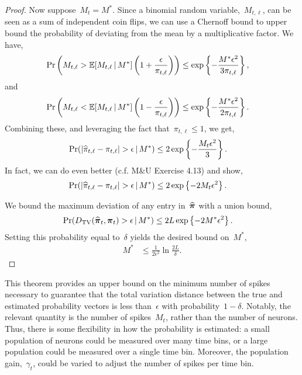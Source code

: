 \begin{proof}
Now suppose~$M_t=M^*$. Since a binomial random variable,~$M_{t,\ell}$, can be seen
as a sum of independent coin flips, we can use a Chernoff bound to
upper bound the probability of deviating from the mean by a
multiplicative factor. We
have,
\begin{align}
  \Pr \left(M_{t, \ell} > \mathbb{E}[M_{t,\ell} \,|\, M^*] \left(1+\frac{\epsilon}{\pi_{t, \ell}} \right) \right) 
  &\leq \exp \left \{- \frac{M^* \epsilon^2}{3 \pi_{t, \ell}} \right \},
\end{align}
and
\begin{align}
  \Pr \left(M_{t, \ell} < \mathbb{E}[M_{t,\ell} \,|\, M^*] \left(1-\frac{\epsilon}{\pi_{t, \ell}} \right) \right) 
  &\leq \exp \left \{- \frac{M^* \epsilon^2}{2 \pi_{t, \ell}} \right \}.
\end{align}
Combining these, and leveraging the fact that~$\pi_{t, \ell} \leq 1$, we get,
\begin{align}
  \Pr(|\widehat{\pi}_{t,\ell} - \pi_{t,\ell} |  > \epsilon \,|\, M^*) 
  & \leq 2 \exp \left \{- \frac{M_t \epsilon^2}{3} \right \}.
\end{align}
In fact, we can do even better (c.f. M\&U Exercise 4.13) and show,
\begin{align}
  \Pr(|\widehat{\pi}_{t,\ell} - \pi_{t,\ell} |  > \epsilon \,|\, M^*) 
  &\leq 2 \exp \left \{-2M_t \epsilon^2 \right \}.
\end{align}

We bound the maximum deviation of any entry in~$\widehat{\boldsymbol{\pi}}$ with a union bound,
\begin{align}
  \Pr({D_{\mathrm{TV}}}(\widehat{\boldsymbol{\pi}}_t, \boldsymbol{\pi}_t) > \epsilon \,|\, M^*) 
  & \leq 2L \exp \left\{-2M^* \epsilon^2 \right\}.
\end{align}
Setting this probability equal to~$\delta$ yields the desired bound on~$M^*$,
\begin{align}
  M^* &\leq \frac{1}{2\epsilon^2} \ln \frac{2L}{\delta}.
\end{align}

\end{proof}


This theorem provides an upper bound on the minimum number of spikes necessary to 
guarantee that the total variation distance between the true and estimated 
probability vectors is less than~$\epsilon$ with probability~$1-\delta$. 
Notably, the relevant quantity is the number of spikes~$M_t$, rather than 
the number of neurons. Thus, there is some flexibility in how the probability 
is estimated: a small population of neurons could be measured over many time bins,
or a large population could be measured over a single time bin. Moreover, the 
population gain,~$\gamma_t$, could be varied to adjust the number of spikes 
per time bin. 


